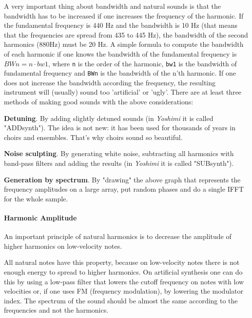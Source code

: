    A very important thing about bandwidth and natural sounds is that the
   bandwidth has to be increased if one increases the frequency of the
   harmonic.  If the fundamental frequency is 440 Hz and the bandwidth is 10
   Hz (that means that the frequencies are spread from 435 to 445 Hz), the
   bandwidth of the second harmonics (880Hz) must be 20 Hz. A simple formula
   to compute the bandwidth of each harmonic if one knows the bandwidth of the
   fundamental frequency is \(BWn = n⋅bw1\), where \texttt{n} is the
   order of the harmonic, \texttt{bw1} is the bandwidth of fundamental
   frequency and \texttt{BWn} is the bandwidth of the n'th harmonic. If one
   does not increase the bandwidth according the frequency, the resulting
   instrument will (usually) sound too 'artificial' or 'ugly'.  There
   are at least three methods of making good sounds with the above
   considerations: 

   \begin{enumber}
      \item \textbf{Detuning}.
      By adding slightly detuned sounds (in \textsl{Yoshimi}
      it is called "ADDsynth"). The idea is not new: it has been used
      for thousands of years in choirs and ensembles. That's why choirs
      sound so beautiful.
      \item \textbf{Noise sculpting}.
      By generating white noise, subtracting all harmonics with band-pass
      filters and adding the results (in \textsl{Yoshimi}
      it is called "SUBsynth").
      \item \textbf{Generation by spectrum}.
      By "drawing" the above graph that represents the frequency
      amplitudes on a large array, put random phases and do a single
      IFFT for the whole sample.
   \end{enumber}

\paragraph{Harmonic Amplitude}
\label{paragraph:concepts_basics_harmonic_amplitude}

   An important principle of natural harmonics is to decrease the amplitude
   of higher harmonics on low-velocity notes.

   All natural notes have this property, because on low-velocity notes there
   is not enough energy to spread to higher harmonics. On artificial
   synthesis one can do this by using a low-pass filter that lowers the
   cutoff frequency on notes with low velocities or, if one uses FM
   (frequency modulation), by lowering the modulator index. 
   The spectrum of the sound should be almost the same according to
   the frequencies and not the harmonics.


